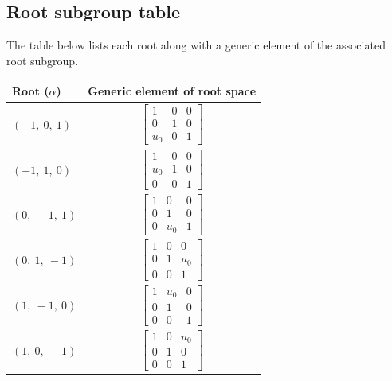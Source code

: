 \documentclass[11pt]{article}
\newcommand{\noi}{\noindent}
\theoremstyle{definition}
\begin{document}
\subsection{Root subgroup table}

\noi The table below lists each root along with a generic element of the associated root subgroup.

\bigskip

\noindent \begin{tabular}{|l|c|}
    \hline
    \textbf{Root ($\alpha$)} & \textbf{Generic element of root space} \\
    \hline
    $\left( -1, \  0, \  1\right)$ & $\left[\begin{matrix}1 & 0 & 0\\0 & 1 & 0\\u_{0} & 0 & 1\end{matrix}\right]$ \\
    \hline
    $\left( -1, \  1, \  0\right)$ & $\left[\begin{matrix}1 & 0 & 0\\u_{0} & 1 & 0\\0 & 0 & 1\end{matrix}\right]$ \\
    \hline
    $\left( 0, \  -1, \  1\right)$ & $\left[\begin{matrix}1 & 0 & 0\\0 & 1 & 0\\0 & u_{0} & 1\end{matrix}\right]$ \\
    \hline
    $\left( 0, \  1, \  -1\right)$ & $\left[\begin{matrix}1 & 0 & 0\\0 & 1 & u_{0}\\0 & 0 & 1\end{matrix}\right]$ \\
    \hline
    $\left( 1, \  -1, \  0\right)$ & $\left[\begin{matrix}1 & u_{0} & 0\\0 & 1 & 0\\0 & 0 & 1\end{matrix}\right]$ \\
    \hline
    $\left( 1, \  0, \  -1\right)$ & $\left[\begin{matrix}1 & 0 & u_{0}\\0 & 1 & 0\\0 & 0 & 1\end{matrix}\right]$ \\
    \hline
\end{tabular}
\end{document}
